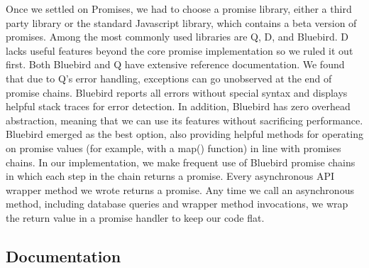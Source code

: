 \documentclass[pageno]{jpaper}
\begin{document}
Once we settled on Promises, we had to choose a promise library, either a third party library or the standard Javascript library, which contains a beta version of promises. Among the most commonly used libraries are Q, D, and Bluebird. D lacks useful features beyond the core promise implementation so we ruled it out first. Both Bluebird and Q have extensive reference documentation. We found that due to Q's error handling, exceptions can go unobserved at the end of promise chains. Bluebird reports all errors without special syntax and displays helpful stack traces for error detection. In addition, Bluebird has zero overhead abstraction, meaning that we can use its features without sacrificing performance. Bluebird emerged as the best option, also providing helpful methods for operating on promise values (for example, with a map() function) in line with promises chains. In our implementation, we make frequent use of Bluebird promise chains in which each step in the chain returns a promise. Every asynchronous API wrapper method we wrote returns a promise. Any time we call an asynchronous method, including database queries and wrapper method invocations, we wrap the return value in a promise handler to keep our code flat.

\subsection{Documentation}
\end{document}
